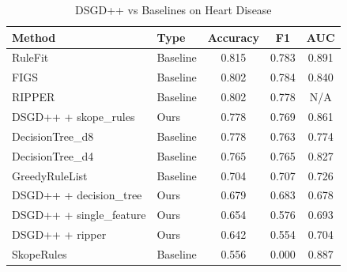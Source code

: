 \begin{table}[htbp]
\centering
\caption{DSGD++ vs Baselines on Heart Disease}
\label{tab:combined_heart_disease}
\begin{tabular}{llccc}
\toprule
Method & Type & Accuracy & F1 & AUC \\
\midrule
RuleFit & Baseline & 0.815 & 0.783 & 0.891 \\
FIGS & Baseline & 0.802 & 0.784 & 0.840 \\
RIPPER & Baseline & 0.802 & 0.778 & N/A \\
DSGD++ + skope_rules & Ours & 0.778 & 0.769 & 0.861 \\
DecisionTree_d8 & Baseline & 0.778 & 0.763 & 0.774 \\
DecisionTree_d4 & Baseline & 0.765 & 0.765 & 0.827 \\
GreedyRuleList & Baseline & 0.704 & 0.707 & 0.726 \\
DSGD++ + decision_tree & Ours & 0.679 & 0.683 & 0.678 \\
DSGD++ + single_feature & Ours & 0.654 & 0.576 & 0.693 \\
DSGD++ + ripper & Ours & 0.642 & 0.554 & 0.704 \\
SkopeRules & Baseline & 0.556 & 0.000 & 0.887 \\
\bottomrule
\end{tabular}
\end{table}